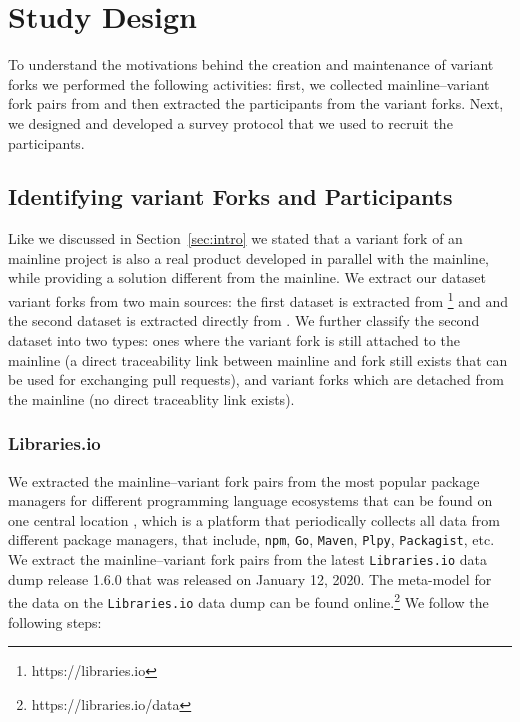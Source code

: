 \section{Study Design}
\label{sec:study_design}
To understand the motivations behind the creation and maintenance of variant forks we performed the following activities: first, we collected mainline--variant fork pairs from \gh and then extracted the participants from the variant forks. Next, we designed and developed a survey protocol that we used to recruit the participants.


\subsection{Identifying variant Forks and Participants}
\label{sec:forks_and_participants}
Like we discussed in Section~\ref{sec:intro} we stated that a variant fork of an mainline project is also a real product developed in parallel with the mainline, while providing a solution different from the mainline.
We extract our dataset variant forks from two main sources: the first dataset is extracted from \librariesio\footnote{https://libraries.io} and and the second dataset is extracted directly from \gh. We further classify the second dataset into two types: ones where the variant fork is still attached to the mainline (a direct traceability link between mainline and fork still exists that can be used for exchanging pull requests), and variant forks which are detached from the mainline (no direct traceablity link exists).


\subsubsection{Libraries.io}
\label{sec:library.io}
We extracted the mainline--variant fork pairs from the most popular package managers for different programming language ecosystems that can be found on one central location \librariesio, which is a platform that periodically collects all data from different package managers, that include, \texttt{npm}, \texttt{Go}, \texttt{Maven}, \texttt{Plpy}, \texttt{Packagist}, etc. We extract the mainline--variant fork pairs from the latest \texttt{Libraries.io} data dump release 1.6.0 that was released on January 12, 2020. The meta-model for the data on the \texttt{Libraries.io} data dump can be found online.\footnote{https://libraries.io/data}
We follow the following steps:

